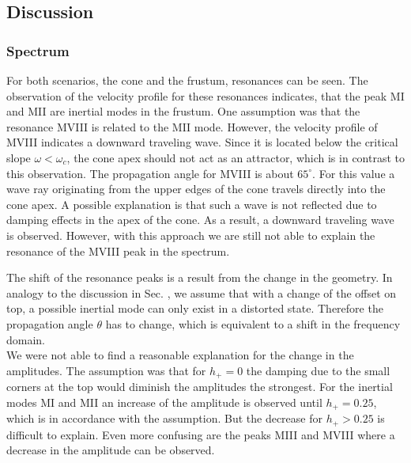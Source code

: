 \subsection{Discussion}%


\subsubsection{Spectrum}

For both scenarios, the cone and the frustum, resonances can be seen.
The observation of the velocity profile for these resonances indicates,
that the peak M\RN{1} and M\RN{2} are inertial modes in the frustum.
One assumption was that the resonance M\RN{8} is related to the M\RN{2} mode.
However, the velocity profile of M\RN{8} indicates a downward traveling wave.
Since it is located below the critical slope $\omega < \omega_c$, the cone apex
should not act as an attractor, which is in contrast to this observation.
The propagation angle for M\RN{8} is about $65^\circ$.
For this value a wave ray originating from the upper edges of the cone travels directly
into the cone apex.
A possible explanation is that such a wave is not reflected due to damping effects in
the apex of the cone. As a result, a downward traveling wave is observed.
However, with this approach we are still not able to explain the resonance of the M\RN{8} peak
in the spectrum.

The shift of the resonance peaks is a result from the change in the geometry.
In analogy to the discussion in Sec. \label{cone:discussion_transition},
 we assume that with a change of the offset on top,
a possible inertial mode can only exist in a distorted state.
Therefore the propagation angle $\theta$ has to change,
which is equivalent to a shift in the frequency domain.\\
We were not able to find a reasonable explanation for the change in the amplitudes.
The assumption was that for $h_+=0$ the damping due to the small corners at the top
would diminish the amplitudes the strongest.
For the inertial modes M\RN{1} and M\RN{2} an increase of the amplitude is observed until $h_+=0.25$,
which is in accordance with the assumption.
But the decrease for $h_+>0.25$ is difficult to explain.
Even more confusing are  the peaks M\RN{3} and M\RN{8} where a decrease in the amplitude
can be observed.

